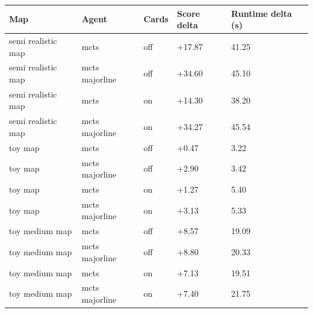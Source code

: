 \begin{tabular}{lllll}
\hline
Map & Agent & Cards & Score delta & Runtime delta (s) \\
\hline
semi realistic map & mcts & off & +17.87 & 41.25 \\
semi realistic map & mcts majorline & off & +34.60 & 45.10 \\
semi realistic map & mcts & on & +14.30 & 38.20 \\
semi realistic map & mcts majorline & on & +34.27 & 45.54 \\
toy map & mcts & off & +0.47 & 3.22 \\
toy map & mcts majorline & off & +2.90 & 3.42 \\
toy map & mcts & on & +1.27 & 5.40 \\
toy map & mcts majorline & on & +3.13 & 5.33 \\
toy medium map & mcts & off & +8.57 & 19.09 \\
toy medium map & mcts majorline & off & +8.80 & 20.33 \\
toy medium map & mcts & on & +7.13 & 19.51 \\
toy medium map & mcts majorline & on & +7.40 & 21.75 \\
\hline
\end{tabular}
